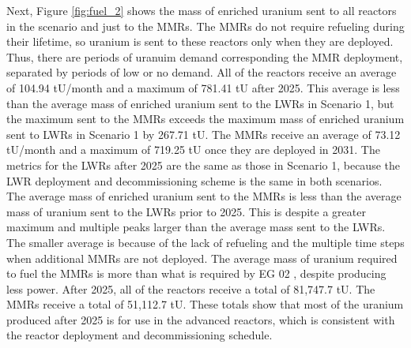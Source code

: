 Next, Figure \ref{fig:fuel_2} shows the mass of enriched uranium sent to all 
reactors in the scenario and just to the \glspl{MMR}. The \glspl{MMR} 
do not require refueling during their lifetime, so uranium is  
sent to these reactors only when they are deployed. Thus, there are periods
of uranuim demand corresponding the \gls{MMR} deployment, separated by periods
of low or no demand. All of the reactors receive an average of 104.94 
tU/month and a maximum of 781.41 tU after 2025. 
This average is less than the average mass of enriched uranium 
sent to the \glspl{LWR} in Scenario 1, but the maximum sent to the \glspl{MMR}
exceeds the maximum 
mass of enriched uranium sent to \glspl{LWR} in Scenario 1 by 267.71 tU.
The \glspl{MMR} receive an average of 73.12 tU/month and a maximum of 719.25 
tU once they are deployed in 2031. The metrics for the \glspl{LWR} after 2025
are the same as those in Scenario 1, because the \gls{LWR} deployment and decommissioning 
scheme is the same in both scenarios.  The average 
mass of enriched uranium sent to the 
\glspl{MMR} is less than the average mass of uranium sent to the \glspl{LWR}
prior to 2025. This is despite a greater maximum and multiple peaks larger
than the
average mass sent to the \glspl{LWR}. The smaller average is because of the 
lack of refueling and the multiple time steps when additional 
\glspl{MMR} are not deployed. The average mass of uranium required to fuel 
the \glspl{MMR} is more than what is required by \gls{EG} 02 
\cite{wigeland_nuclear_2014}, despite producing less power. 
After 2025, all of the reactors receive a total of 81,747.7 tU. The  
\glspl{MMR} receive a total of 51,112.7 tU. These totals show that most 
of the uranium produced after 2025 is for use in the advanced reactors, 
which is consistent with the reactor deployment and decommissioning schedule. 

